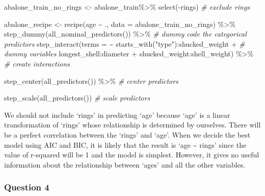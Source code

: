 \documentclass[
]{article}
\newenvironment{Shaded}{\begin{snugshade}}{\end{snugshade}}
\newcommand{\AttributeTok}[1]{\textcolor[rgb]{0.77,0.63,0.00}{#1}}
\newcommand{\CommentTok}[1]{\textcolor[rgb]{0.56,0.35,0.01}{\textit{#1}}}
\newcommand{\FunctionTok}[1]{\textcolor[rgb]{0.00,0.00,0.00}{#1}}
\newcommand{\NormalTok}[1]{#1}
\newcommand{\OtherTok}[1]{\textcolor[rgb]{0.56,0.35,0.01}{#1}}
\newcommand{\SpecialCharTok}[1]{\textcolor[rgb]{0.00,0.00,0.00}{#1}}
\newcommand{\StringTok}[1]{\textcolor[rgb]{0.31,0.60,0.02}{#1}}
\begin{document}
\begin{Shaded}
\begin{Highlighting}[]
\NormalTok{abalone\_train\_no\_rings }\OtherTok{\textless{}{-}}\NormalTok{ abalone\_train}\SpecialCharTok{\%\textgreater{}\%} \FunctionTok{select}\NormalTok{(}\SpecialCharTok{{-}}\NormalTok{rings) }\CommentTok{\# exclude rings}

\NormalTok{abalone\_recipe }\OtherTok{\textless{}{-}} \FunctionTok{recipe}\NormalTok{(age }\SpecialCharTok{\textasciitilde{}}\NormalTok{ ., }\AttributeTok{data =}\NormalTok{ abalone\_train\_no\_rings) }\SpecialCharTok{\%\textgreater{}\%} 
  \FunctionTok{step\_dummy}\NormalTok{(}\FunctionTok{all\_nominal\_predictors}\NormalTok{()) }\SpecialCharTok{\%\textgreater{}\%}   \CommentTok{\# dummy code the categorical predictors}
  \FunctionTok{step\_interact}\NormalTok{(}\AttributeTok{terms =} \SpecialCharTok{\textasciitilde{}} \FunctionTok{starts\_with}\NormalTok{(}\StringTok{"type"}\NormalTok{)}\SpecialCharTok{:}\NormalTok{shucked\_weight }\SpecialCharTok{+}  \CommentTok{\# dummy variables }
\NormalTok{                  longest\_shell}\SpecialCharTok{:}\NormalTok{diameter }\SpecialCharTok{+}   
\NormalTok{                 shucked\_weight}\SpecialCharTok{:}\NormalTok{shell\_weight) }\SpecialCharTok{\%\textgreater{}\%}  \CommentTok{\# create interactions}
  
  \FunctionTok{step\_center}\NormalTok{(}\FunctionTok{all\_predictors}\NormalTok{()) }\SpecialCharTok{\%\textgreater{}\%}  \CommentTok{\# center predictors}
  
  \FunctionTok{step\_scale}\NormalTok{(}\FunctionTok{all\_predictors}\NormalTok{())  }\CommentTok{\# scale predictors}
\end{Highlighting}
\end{Shaded}

We should not include `rings' in predicting `age' because `age' is a
linear transformation of `rings' whose relationship is determined by
ourselves. There will be a perfect correlation between the `rings' and
`age'. When we decide the best model using AIC and BIC, it is likely
that the result is `age \textasciitilde{} rings' since the value of
r-squared will be 1 and the model is simplest. However, it gives no
useful information about the relationship between `ages' and all the
other variables.

\hypertarget{question-4}{%
\subsubsection{Question 4}\label{question-4}}
\end{document}
